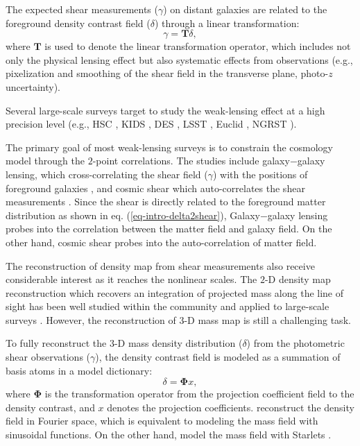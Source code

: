 \documentclass[twocolumn]{aastex62}
\begin{document}
The expected shear measurements ($\gamma$) on distant galaxies are related to
the foreground density contrast field ($\delta$) through a linear
transformation:
\begin{equation} \label{eq-intro-delta2shear}
    \gamma=\mathbf{T} \delta,
\end{equation}
where $\mathbf{T}$ is used to denote the linear
transformation operator, which includes not only the physical lensing effect but
also systematic effects from observations (e.g., pixelization and smoothing of
the shear field in the transverse plane, photo-$z$ uncertainty).

Several large-scale surveys target to study the weak-lensing effect at a high
precision level (e.g., HSC \citep{HSC1-data}, KIDS \citep{KIDS13}, DES
\citep{DES05}, LSST \citep{LSSTScienceBook}, Euclid \citep{Euclid2011}, NGRST
\citep{WFIRST15}).

The primary goal of most weak-lensing surveys is to constrain the cosmology
model through the $2$-point correlations. The studies include galaxy$-$galaxy
lensing, which cross-correlating the shear field ($\gamma$) with the positions
of foreground galaxies
\citep{gglens-GAMA-Han2014,gglens-BossCFHTMore2015,gglens-DES1}, and cosmic
shear which auto-correlates the shear measurements
\citep{cosmicShearRealKids450,cosmicShear-DES1,cosmicShear_HSC1_Chiaki2019,cosmicShear_HSC1_Hamana2019}.
Since the shear is directly related to the foreground matter distribution as
shown in eq. (\ref{eq-intro-delta2shear}), Galaxy$-$galaxy lensing probes into
the correlation between the matter field and galaxy field. On the other hand,
cosmic shear probes into the auto-correlation of matter field.

The reconstruction of density map from shear measurements also receive
considerable interest as it reaches the nonlinear scales. The $2$-D density map
reconstruction which recovers an integration of projected mass along the line of
sight has been well studied within the community
\citep{massMap-KS1993,WL-massMap-Glimpse2D-Lanusse2016,sparseBaysianMassMap-Price2020}
and applied to large-scale surveys
\citep{HSC1-massMaps,massMapDES-Chang2018,DES-SV-massMap-sparsity}. However,
the reconstruction of $3$-D mass map is still a challenging task.

To fully reconstruct the $3$-D mass density distribution ($\delta$) from the
photometric shear observations ($\gamma$), the density contrast field is
modeled as a summation of basis atoms in a model dictionary:
\begin{equation} \label{eq-intro-dict}
 \delta= \mathbf{\Phi} x,
\end{equation}
where $\mathbf{\Phi}$ is the transformation operator from the projection
coefficient field to the density contrast, and $x$ denotes the projection
coefficients. \citet{LSS-massMap-Wiener-Simon2009} reconstruct the density
field in Fourier space, which is equivalent to modeling the mass field with
sinusoidal functions.  On the other hand,
\citet{LSS-massMap-Glimpse3D-Leonard2014} model the mass field with Starlets
\citep{Starlet-Starck2015}.
\end{document}
